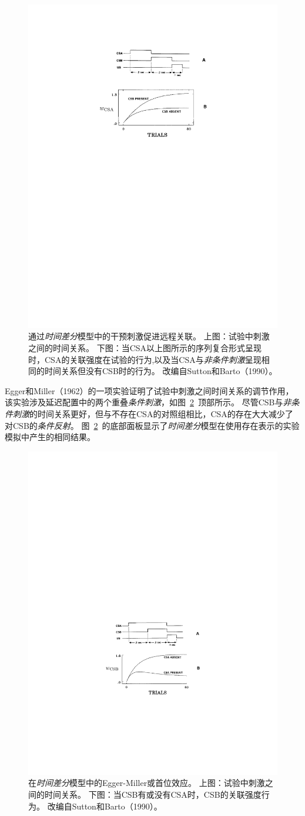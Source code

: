 \begin{figure}[!htb]
	\centering
	\includegraphics[width=0.5\linewidth]{chap11/fig_11_2}
	\caption{通过\textit{时间差分}模型中的干预刺激促进远程关联。
		上图：试验中刺激之间的时间关系。
		下图：当CSA以上图所示的序列复合形式呈现时，CSA的关联强度在试验的行为,以及当CSA与\textit{非条件刺激}呈现相同的时间关系但没有CSB时的行为。
		改编自Sutton和Barto（1990）。  \label{fig:11_2}}
\end{figure}


Egger和Miller（1962）的一项实验证明了试验中刺激之间时间关系的调节作用，该实验涉及延迟配置中的两个重叠\textit{条件刺激}，如图~\ref{fig:11_3}~顶部所示。
尽管CSB与\textit{非条件刺激}的时间关系更好，但与不存在CSA的对照组相比，CSA的存在大大减少了对CSB的\textit{条件反射}。
图~\ref{fig:11_3}~的底部面板显示了\textit{时间差分}模型在使用存在表示的实验模拟中产生的相同结果。

\begin{figure}[!htb]
	\centering
	\includegraphics[width=0.5\linewidth]{chap11/fig_11_3}
	\caption{在\textit{时间差分}模型中的Egger-Miller或首位效应。
		上图：试验中刺激之间的时间关系。
		下图：当CSB有或没有CSA时，CSB的关联强度行为。
		改编自Sutton和Barto（1990）。  \label{fig:11_3}}
\end{figure}


